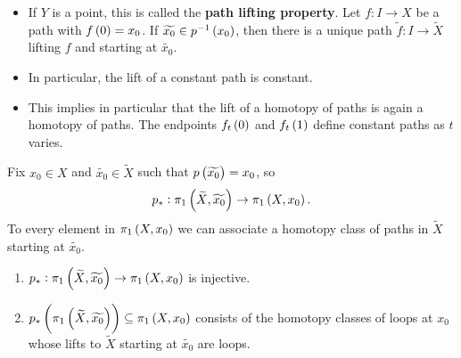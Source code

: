 \begin{remark*}
\hfill
\begin{itemize}
\item If $ Y $ is a point, this is called the \textbf{path lifting property}. Let $ f : I \to X $ be a path with $ f\br{0} = x_0 $. If $ \widetilde{x_0} \in p^{-1}\br{x_0} $, then there is a unique path $ \widetilde{f} : I \to \widetilde{X} $ lifting $ f $ and starting at $ \widetilde{x_0} $.
\item In particular, the lift of a constant path is constant.
\item This implies in particular that the lift of a homotopy of paths is again a homotopy of paths. The endpoints $ f_t\br{0} $ and $ f_t\br{1} $ define constant paths as $ t $ varies.
\end{itemize}
\end{remark*}

Fix $ x_0 \in X $ and $ \widetilde{x_0} \in \widetilde{X} $ such that $ p\br{\widetilde{x_0}} = x_0 $, so
$$ p_* : \pi_1\br{\widetilde{X}, \widetilde{x_0}} \to \pi_1\br{X, x_0}. $$
To every element in $ \pi_1\br{X, x_0} $ we can associate a homotopy class of paths in $ \widetilde{X} $ starting at $ \widetilde{x_0} $.

\begin{proposition}
\label{prop:1.31}
\hfill
\begin{enumerate}
\item $ p_* : \pi_1\br{\widetilde{X}, \widetilde{x_0}} \to \pi_1\br{X, x_0} $ is injective.
\item $ p_*\br{\pi_1\br{\widetilde{X}, \widetilde{x_0}}} \subseteq \pi_1\br{X, x_0} $ consists of the homotopy classes of loops at $ x_0 $ whose lifts to $ \widetilde{X} $ starting at $ \widetilde{x_0} $ are loops.
\end{enumerate}
\end{proposition}

